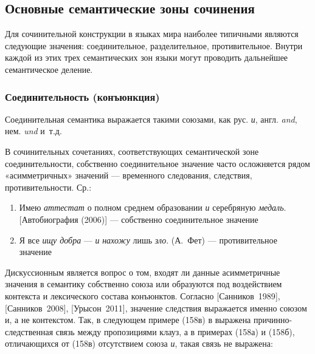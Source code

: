 \subsection{Основные семантические зоны
  сочинения}\label{ux43eux441ux43dux43eux432ux43dux44bux435-ux441ux435ux43cux430ux43dux442ux438ux447ux435ux441ux43aux438ux435-ux437ux43eux43dux44b-ux441ux43eux447ux438ux43dux435ux43dux438ux44f}

Для сочинительной конструкции в языках мира наиболее типичными являются
следующие значения: соединительное, разделительное, противительное.
Внутри каждой из этих трех семантических зон языки могут проводить
дальнейшее семантическое деление.

\subsubsection{Соединительность
  (конъюнкция)}\label{ux441ux43eux435ux434ux438ux43dux438ux442ux435ux43bux44cux43dux43eux441ux442ux44c-ux43aux43eux43dux44aux44eux43dux43aux446ux438ux44f}

Соединительная семантика выражается такими союзами, как рус. \textit{и},
англ. \textit{and}, нем. \textit{und} и~т.д.

В сочинительных сочетаниях, соответствующих семантической зоне
соединительности, собственно соединительное значение часто осложняется
рядом «асимметричных» значений --- временного следования, следствия,
противительности. Ср.:

\begin{enumerate}
  \def\labelenumi{(\arabic{enumi})}
  \setcounter{enumi}{155}
  \item
        Имею \textit{аттестат} о полном среднем образовании \textit{и} серебряную
        \textit{медаль}. {[}Автобиография (2006){]} --- собственно соединительное
        значение
  \item
        Я все \textit{ищу добра} --- \textit{и} \textit{нахожу} лишь \textit{зло}.
        (А.~Фет) --- противительное значение
\end{enumerate}

Дискуссионным является вопрос о том, входят ли данные асимметричные
значения в семантику собственно союза или образуются под воздействием
контекста и лексического состава конъюнктов. Согласно
{[}Санников~1989{]}, {[}Санников~2008{]}, {[}Урысон~2011{]}, значение
следствия выражается именно союзом и, а не контекстом. Так, в следующем
примере (158в) в выражена причинно-следственная связь между пропозициями
клауз, а в примерах (158а) и (158б), отличающихся от (158в) отсутствием
союза \textit{и}, такая связь не выражена:

